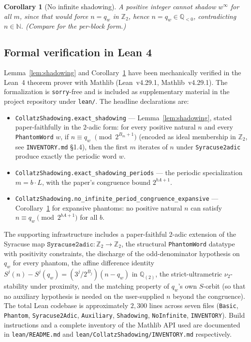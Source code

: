 \documentclass[11pt,a4paper]{article}
\newtheorem{corollary}[theorem]{Corollary}
\theoremstyle{definition}
\newcommand{\Zp}{\mathbb{Z}_2}
\newcommand{\Q}{\mathbb{Q}}
\newcommand{\N}{\mathbb{N}}
\begin{document}
\begin{corollary}[No infinite shadowing]\label{cor:no-infinite}
A positive integer cannot shadow $w^\infty$ for all $m$, since that
would force $n = q_w$ in $\Zp$, hence $n = q_w \in \Q_{<0}$,
contradicting $n \in \N$. (Compare \cite[Lemma~9.20]{chang2026} for
the per-block form.)
\end{corollary}

\subsection{Formal verification in Lean 4}
\label{sec:formalization}

Lemma~\ref{lem:shadowing} and Corollary~\ref{cor:no-infinite} have
been mechanically verified in the Lean~4 theorem prover with
Mathlib (Lean~v4.29.1, Mathlib~v4.29.1). The formalization is
\texttt{sorry}-free and is included as supplementary material in
the project repository under \texttt{lean/}. The headline
declarations are:
\begin{itemize}
  \item \texttt{CollatzShadowing.exact\_shadowing} ---
        Lemma~\ref{lem:shadowing}, stated paper-faithfully in the
        $2$-adic form: for every positive natural $n$ and every
        \texttt{PhantomWord} $w$, if $n \equiv q_w$
        $\pmod{2^{B_m+1}}$ (encoded as ideal membership in
        $\Zp$, see \texttt{INVENTORY.md} \S 1.4), then the first
        $m$ iterates of $n$ under \texttt{Syracuse2adic}
        produce exactly the periodic word $w$.
  \item \texttt{CollatzShadowing.exact\_shadowing\_periods} ---
        the periodic specialization $m = b \cdot L$, with the
        paper's congruence bound $2^{b A + 1}$.
  \item \texttt{CollatzShadowing.no\_infinite\_period\_congruence\_expansive}
        --- Corollary~\ref{cor:no-infinite} for expansive
        phantoms: no positive natural $n$ can satisfy
        $n \equiv q_w \pmod{2^{b A + 1}}$ for all $b$.
\end{itemize}
The supporting infrastructure includes a paper-faithful
$2$-adic extension of the Syracuse map
$\mathtt{Syracuse2adic}\colon \Zp \to \Zp$, the structural
\texttt{PhantomWord} datatype with positivity constraints, the
discharge of the odd-denominator hypothesis on $q_w$ for every
phantom, the affine difference identity $S^j(n) - S^j(q_w) =
(3^j / 2^{B_j})(n - q_w)$ in $\Q_{(2)}$, the strict-ultrametric
$\nu_2$-stability under proximity, and the matching property of
$q_w$'s own $S$-orbit (so that no auxiliary hypothesis is needed
on the user-supplied $n$ beyond the congruence). The total Lean
codebase is approximately $2{,}300$ lines across seven files
(\texttt{Basic}, \texttt{Phantom}, \texttt{Syracuse2Adic},
\texttt{Auxiliary}, \texttt{Shadowing}, \texttt{NoInfinite},
\texttt{INVENTORY}). Build instructions and a complete inventory
of the Mathlib API used are documented in \texttt{lean/README.md}
and \texttt{lean/CollatzShadowing/INVENTORY.md} respectively.
\end{document}
